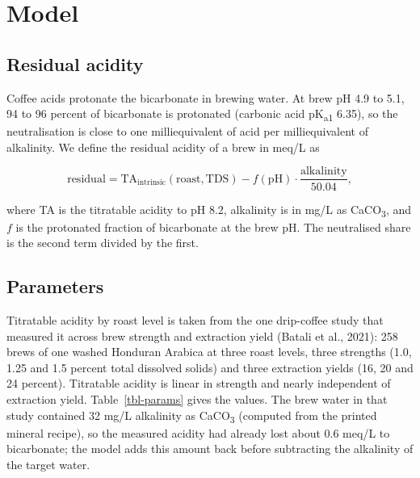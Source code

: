 \documentclass[
  a4paper,
]{article}
\begin{document}
\section{Model}\label{model}

\subsection{Residual acidity}\label{residual-acidity}

Coffee acids protonate the bicarbonate in brewing water. At brew pH 4.9
to 5.1, 94 to 96 percent of bicarbonate is protonated (carbonic acid
pK\textsubscript{a1} 6.35), so the neutralisation is close to one
milliequivalent of acid per milliequivalent of alkalinity. We define the
residual acidity of a brew in meq/L as

\[
\mathrm{residual} = \mathrm{TA}_\mathrm{intrinsic}(\mathrm{roast}, \mathrm{TDS}) - f(\mathrm{pH}) \cdot \frac{\mathrm{alkalinity}}{50.04},
\]

where TA is the titratable acidity to pH 8.2, alkalinity is in mg/L as
CaCO\textsubscript{3}, and \(f\) is the protonated fraction of
bicarbonate at the brew pH. The neutralised share is the second term
divided by the first.

\subsection{Parameters}\label{parameters}

Titratable acidity by roast level is taken from the one drip-coffee
study that measured it across brew strength and extraction yield (Batali
et al., 2021): 258 brews of one washed Honduran Arabica at three roast
levels, three strengths (1.0, 1.25 and 1.5 percent total dissolved
solids) and three extraction yields (16, 20 and 24 percent). Titratable
acidity is linear in strength and nearly independent of extraction
yield. Table~\ref{tbl-params} gives the values. The brew water in that
study contained 32 mg/L alkalinity as CaCO\textsubscript{3} (computed
from the printed mineral recipe), so the measured acidity had already
lost about 0.6 meq/L to bicarbonate; the model adds this amount back
before subtracting the alkalinity of the target water.
\end{document}
